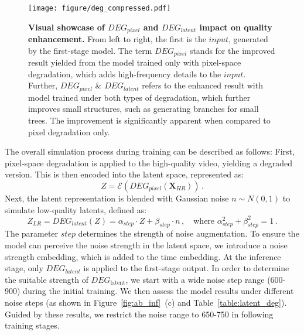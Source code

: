 \begin{figure}[!t]
\begin{center}
\texttt{[image: figure/deg\_compressed.pdf]}
\end{center}

\caption{\textbf{Visual showcase of $DEG_{pixel}$ and $DEG_{latent}$ impact on quality enhancement.}  From left to right, the first is the $input$, generated by the first-stage model. The term $DEG_{pixel}$ stands for the improved result yielded from the model trained only with pixel-space degradation, which adds high-frequency details to the $input$. Further, $DEG_{pixel}$ \& $DEG_{latent}$ refers to the enhanced result with model trained under both types of degradation, which further  improves small structures, such as generating branches for small trees. The improvement is significantly apparent when compared to pixel degradation only.}


\label{fig:deg_ab}
\end{figure}
 
The overall simulation process during training can be described as follows: First, pixel-space degradation is applied to the high-quality video, yielding a degraded version. This is then encoded into the latent space, represented as:
\begin{equation}
Z = \mathcal{E} \left( DEG_{pixel} \left (\mathbf{X}_{HR} \right) \right) \,.
\end{equation}
Next, the latent representation is blended with Gaussian noise $ n \sim N(0,1) $ to simulate low-quality latents, defined as:
\begin{equation}\label{eq:lq-formulation} 
Z_{LR} = DEG_{latent}(Z) = \alpha_{step} \cdot Z + \beta_{step} \cdot n \,, \quad \text{where } \alpha_{step}^2 + \beta_{step}^2 = 1 \,.
\end{equation}
The parameter $step$ determines the strength of noise augmentation. To ensure the model can perceive the noise strength in the latent space, we introduce a noise strength embedding, which is added to the time embedding. At the inference stage, only $DEG_{latent}$ is applied to the first-stage output.  In order to determine the suitable  strength of $DEG_{\text{latent}}$, we start with a wide noise step range (600-900) during the initial training. We then assess the model results under different noise steps (as shown in Figure~\ref{fig:ab_inf}~(c) and Table~\ref{table:latent_deg}). Guided by these results, we restrict the noise range to 650-750 in following training stages.



